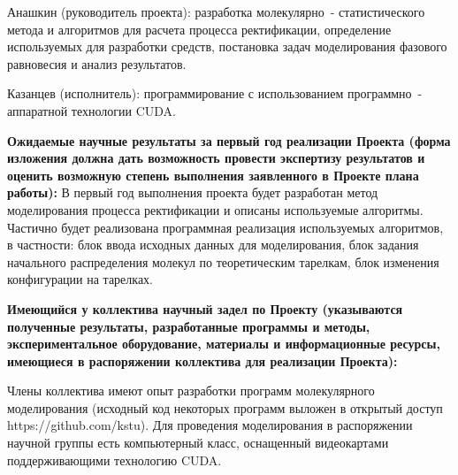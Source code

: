 Анашкин (руководитель проекта): разработка молекулярно~- статистического метода и алгоритмов для расчета процесса ректификации, определение используемых для разработки средств, постановка задач моделирования фазового равновесия и анализ результатов.

Казанцев (исполнитель): программирование с использованием программно~- аппаратной технологии CUDA. 


\textbf{Ожидаемые научные результаты за первый год реализации Проекта (форма изложения должна дать возможность провести экспертизу результатов и оценить возможную степень выполнения заявленного в Проекте плана работы):}
В первый год выполнения проекта будет разработан метод моделирования процесса ректификации и описаны используемые алгоритмы. Частично будет реализована программная реализация используемых алгоритмов, в частности: блок ввода исходных данных для моделирования, блок задания начального распределения молекул по теоретическим тарелкам, блок изменения конфигурации на тарелках.


\textbf{Имеющийся у коллектива научный задел по Проекту (указываются полученные результаты, разработанные программы и методы, экспериментальное оборудование, материалы и информационные ресурсы, имеющиеся в распоряжении коллектива для реализации Проекта):}

Члены коллектива имеют опыт разработки программ молекулярного моделирования (исходный код некоторых программ выложен в открытый доступ https://github.com/kstu). Для проведения моделирования в распоряжении научной группы есть компьютерный класс, оснащенный видеокартами поддерживающими технологию CUDA. 

